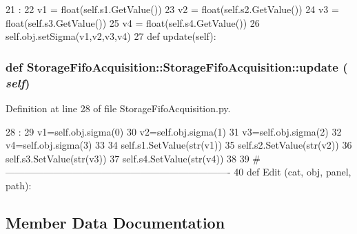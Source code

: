 \begin{DoxyCode}
21                             :
22         v1 = float(self.s1.GetValue())
23         v2 = float(self.s2.GetValue())
24         v3 = float(self.s3.GetValue())
25         v4 = float(self.s4.GetValue())
26         self.obj.setSigma(v1,v2,v3,v4)
27 
    def update(self):
\end{DoxyCode}
\hypertarget{classStorageFifoAcquisition_1_1StorageFifoAcquisition_a276f4c3f4d8bde7a86f4dbc0d708fb93}{
\subsubsection[{update}]{\setlength{\rightskip}{0pt plus 5cm}def StorageFifoAcquisition::StorageFifoAcquisition::update ( {\em self})}}
\label{classStorageFifoAcquisition_1_1StorageFifoAcquisition_a276f4c3f4d8bde7a86f4dbc0d708fb93}


Definition at line 28 of file StorageFifoAcquisition.py.


\begin{DoxyCode}
28                     :
29         v1=self.obj.sigma(0)
30         v2=self.obj.sigma(1)
31         v3=self.obj.sigma(2)
32         v4=self.obj.sigma(3)
33 
34         self.s1.SetValue(str(v1))
35         self.s2.SetValue(str(v2))
36         self.s3.SetValue(str(v3))
37         self.s4.SetValue(str(v4))        
38 
39 #----------------------------------------------------------------------
40 
def Edit (cat, obj, panel, path):
\end{DoxyCode}


\subsection{Member Data Documentation}
\hypertarget{classStorageFifoAcquisition_1_1StorageFifoAcquisition_a7cd0cec2d3b2189735989941f9df5c56}{
\subsubsection[{s1}]{}}
\label{classStorageFifoAcquisition_1_1StorageFifoAcquisition_a7cd0cec2d3b2189735989941f9df5c56}


